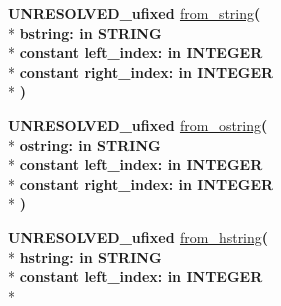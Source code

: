 \begin{DoxyCompactItemize}
\item 
{\bfseries {\bfseries \textcolor{vhdlchar}{U\+N\+R\+E\+S\+O\+L\+V\+E\+D\+\_\+ufixed}\textcolor{vhdlchar}{ }}} \hyperlink{class__fixed__pkg_aeab263e2ba2f221f75e5c777fc4d4e31}{from\+\_\+string}{\bfseries  ( }\\*
{\bfseries \textcolor{vhdlchar}{bstring\+: }\textcolor{stringliteral}{in }{\bfseries \textcolor{comment}{S\+T\+R\+I\+N\+G}\textcolor{vhdlchar}{ }}}\\*
{\bfseries {\bfseries \textcolor{keywordflow}{constant}\textcolor{vhdlchar}{ }}\textcolor{vhdlchar}{left\+\_\+index\+: }\textcolor{stringliteral}{in }{\bfseries \textcolor{comment}{I\+N\+T\+E\+G\+E\+R}\textcolor{vhdlchar}{ }}}\\*
{\bfseries {\bfseries \textcolor{keywordflow}{constant}\textcolor{vhdlchar}{ }}\textcolor{vhdlchar}{right\+\_\+index\+: }\textcolor{stringliteral}{in }{\bfseries \textcolor{comment}{I\+N\+T\+E\+G\+E\+R}\textcolor{vhdlchar}{ }}}\\*
{\bfseries  )} 
\item 
{\bfseries {\bfseries \textcolor{vhdlchar}{U\+N\+R\+E\+S\+O\+L\+V\+E\+D\+\_\+ufixed}\textcolor{vhdlchar}{ }}} \hyperlink{class__fixed__pkg_ac21b381d5dc0c001dc930721aacd668f}{from\+\_\+ostring}{\bfseries  ( }\\*
{\bfseries \textcolor{vhdlchar}{ostring\+: }\textcolor{stringliteral}{in }{\bfseries \textcolor{comment}{S\+T\+R\+I\+N\+G}\textcolor{vhdlchar}{ }}}\\*
{\bfseries {\bfseries \textcolor{keywordflow}{constant}\textcolor{vhdlchar}{ }}\textcolor{vhdlchar}{left\+\_\+index\+: }\textcolor{stringliteral}{in }{\bfseries \textcolor{comment}{I\+N\+T\+E\+G\+E\+R}\textcolor{vhdlchar}{ }}}\\*
{\bfseries {\bfseries \textcolor{keywordflow}{constant}\textcolor{vhdlchar}{ }}\textcolor{vhdlchar}{right\+\_\+index\+: }\textcolor{stringliteral}{in }{\bfseries \textcolor{comment}{I\+N\+T\+E\+G\+E\+R}\textcolor{vhdlchar}{ }}}\\*
{\bfseries  )} 
\item 
{\bfseries {\bfseries \textcolor{vhdlchar}{U\+N\+R\+E\+S\+O\+L\+V\+E\+D\+\_\+ufixed}\textcolor{vhdlchar}{ }}} \hyperlink{class__fixed__pkg_a2b8346249788ae734131b93a72b6529e}{from\+\_\+hstring}{\bfseries  ( }\\*
{\bfseries \textcolor{vhdlchar}{hstring\+: }\textcolor{stringliteral}{in }{\bfseries \textcolor{comment}{S\+T\+R\+I\+N\+G}\textcolor{vhdlchar}{ }}}\\*
{\bfseries {\bfseries \textcolor{keywordflow}{constant}\textcolor{vhdlchar}{ }}\textcolor{vhdlchar}{left\+\_\+index\+: }\textcolor{stringliteral}{in }{\bfseries \textcolor{comment}{I\+N\+T\+E\+G\+E\+R}\textcolor{vhdlchar}{ }}}\\*

\end{DoxyCompactItemize}
